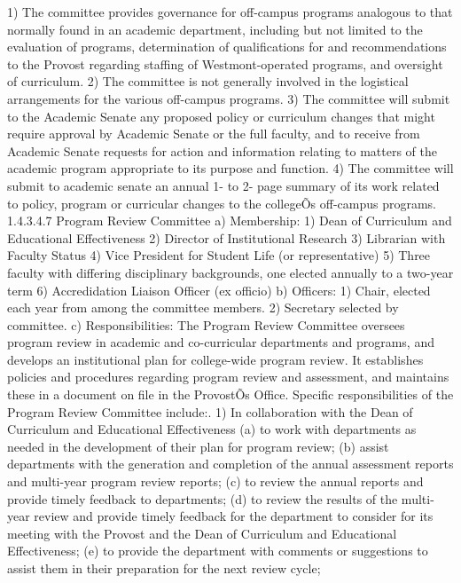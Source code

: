 \documentclass[letterpaper, 11pt]{article}
\begin{document}
				1) The committee provides governance for off-campus programs analogous to that normally found in an academic department, including but not limited to the evaluation of programs, determination of qualifications for and recommendations to the Provost regarding staffing of Westmont-operated programs, and oversight of curriculum.
				2) The committee is not generally involved in the logistical arrangements for the various off-campus programs.
				3) The committee will submit to the Academic Senate any proposed policy or curriculum changes that might require approval by Academic Senate or the full faculty, and to receive from Academic Senate requests for action and information relating to matters of the academic program appropriate to its purpose and function.
				4) The committee will submit to academic senate an annual 1- to 2- page summary of its work related to policy, program or curricular changes to the collegeÕs off-campus programs.
				1.4.3.4.7 Program Review Committee
				a) Membership:
				1) Dean of Curriculum and Educational Effectiveness
				2) Director of Institutional Research
				3) Librarian with Faculty Status
				4) Vice President for Student Life (or representative)
				5) Three faculty with differing disciplinary backgrounds, one elected annually to a two-year term
				6) Accredidation Liaison Officer (ex officio)
				b) Officers:
				1) Chair, elected each year from among the committee members.
				2) Secretary selected by committee.
				c) Responsibilities:
				The Program Review Committee oversees program review in academic and co-curricular departments and programs, and develops an institutional plan for college-wide program review.  It establishes policies and procedures regarding program review and assessment, and maintains these in a document on file in the ProvostÕs Office.  Specific responsibilities of the Program Review Committee include:.
				1) In collaboration with the Dean of Curriculum and Educational Effectiveness
				(a) to work with departments as needed in the development of their plan for program review;
				(b) assist departments with the generation and completion of the annual assessment reports and multi-year program review reports;
				(c) to review the annual reports and provide timely feedback to departments;
				(d) to review the results of the multi-year review and provide timely feedback for the department to consider for its meeting with the Provost and the Dean of Curriculum and Educational Effectiveness;
				(e) to provide the department with comments or suggestions to assist them in their preparation for the next review cycle;
\end{document}
